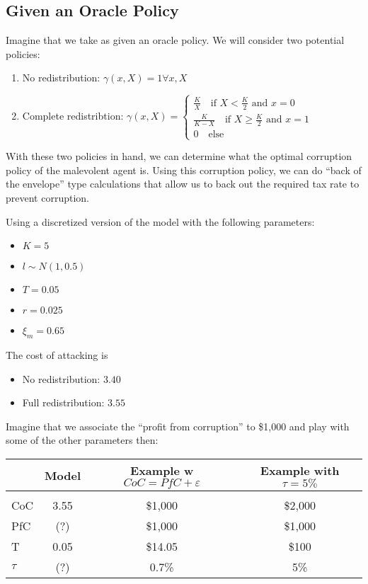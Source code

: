 \documentclass[12pt]{article}
\begin{document}
  \subsection{Given an Oracle Policy}

    Imagine that we take as given an oracle policy. We will consider two potential policies:

    \begin{enumerate}
      \item No redistribution: $\gamma(x, X) = 1 \forall x, X$
      \item Complete redistribtion: $\gamma(x, X) = \begin{cases}
      \frac{K}{X} \quad \text{if } X < \frac{K}{2} \text{ and } x = 0 \\
      \frac{K}{K - X} \quad \text{if } X \geq \frac{K}{2} \text{ and } x = 1 \\
      0 \quad \text{else} \end{cases}$
    \end{enumerate}

    With these two policies in hand, we can determine what the optimal corruption policy of the
    malevolent agent is. Using this corruption policy, we can do ``back of the envelope'' type
    calculations that allow us to back out the required tax rate to prevent corruption.

    Using a discretized version of the model with the following parameters:

    \begin{itemize}
      \item $K=5$
      \item $l \sim N(1, 0.5)$
      \item $T = 0.05$
      \item $r = 0.025$
      \item $\xi_m = 0.65$
    \end{itemize}

    The cost of attacking is

    \begin{itemize}
      \item No redistribution: $3.40$
      \item Full redistribution: $3.55$
    \end{itemize}

    Imagine that we associate the ``profit from corruption'' to \$1,000 and play with some of the
    other parameters then:

    \begin{center}
    \begin{tabular}{l|ccc}
      & Model & Example w $CoC = PfC + \varepsilon$ & Example with $\tau = 5\%$ \\
      \hline \\
      CoC & 3.55 & \$1,000 &  \$2,000 \\
      PfC & (?) & \$1,000 & \$1,000 \\
      T & 0.05 & \$14.05 & \$100 \\
      $\tau$ & (?) & 0.7\% & 5\% \\
    \end{tabular}
    \end{center}
\end{document}
